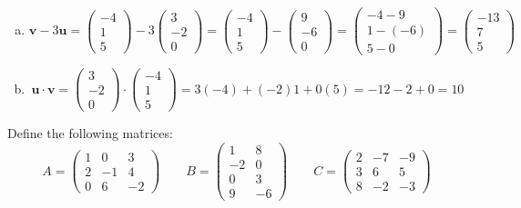 \documentclass[12pt,letterpaper]{exam}
\begin{document}
\begin{questions}
\begin{enumerate}[(a)]
\item 
	\[
	\mathbf{v} - 3 \mathbf{u}= \begin{pmatrix} -4 \\ 1 \\ 5 \end{pmatrix} - 3 \begin{pmatrix} 3 \\ -2 \\ 0 \end{pmatrix}= \begin{pmatrix} -4 \\ 1 \\ 5 \end{pmatrix} - \begin{pmatrix} 9 \\ -6 \\ 0 \end{pmatrix}= \begin{pmatrix} -4 - 9 \\ 1 - (-6) \\ 5 - 0 \end{pmatrix}= \begin{pmatrix} -13 \\ 7 \\ 5 \end{pmatrix}
	\] \pspace

\item 
	\[
	\mathbf{u} \cdot \mathbf{v}= \begin{pmatrix} 3 \\ -2 \\ 0 \end{pmatrix} \cdot \begin{pmatrix} -4 \\ 1 \\ 5 \end{pmatrix}= 3(-4) + (-2)1 + 0(5)= -12 - 2 + 0= 10
	\]
\end{enumerate}



\newpage
\question[10] Define the following matrices:
	\[
	A= \begin{pmatrix} 1 & 0 & 3 \\ 2 & -1 & 4 \\ 0 & 6 & -2 \end{pmatrix} \qquad
	B= \begin{pmatrix} 1 & 8 \\ -2 & 0 \\ 0 & 3 \\ 9 & -6 \end{pmatrix} \qquad
	C= \begin{pmatrix} 2 & -7 & -9 \\ 3 & 6 & 5 \\ 8 & -2 & -3 \end{pmatrix}
	\]


\end{questions}
\end{document}
